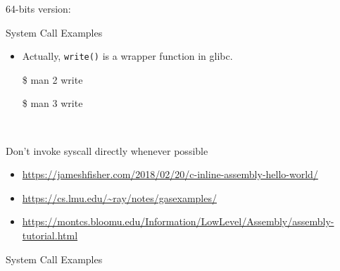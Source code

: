 64-bits version:

\begin{frame}{System Call Examples}
  \begin{minipage}{.55\linewidth}
  \end{minipage}\quad
  \begin{minipage}{.4\linewidth}\ttfamily\footnotesize
    \begin{itemize}
    \item Actually, \texttt{write()} is a wrapper function in glibc.
    \item[\$] man 2 write
    \item[\$] man 3 write
    \end{itemize}
  \end{minipage}\\[1em]
  \begin{description}
  \item[Don't invoke syscall directly whenever possible]
  \end{description}
\end{frame}

\begin{itemize}
\item \url{https://jameshfisher.com/2018/02/20/c-inline-assembly-hello-world/}
\item \url{https://cs.lmu.edu/~ray/notes/gasexamples/}
\item \url{https://montcs.bloomu.edu/Information/LowLevel/Assembly/assembly-tutorial.html}
\end{itemize}

\begin{frame}{System Call Examples}
  \begin{center}
  \end{center}
\end{frame}

\begin{frame}
  \begin{center}
  \end{center}
\end{frame}

